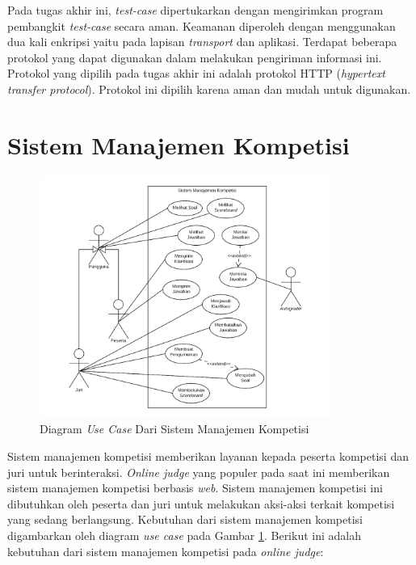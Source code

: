 \par Pada tugas akhir ini, \textit{test-case} dipertukarkan dengan mengirimkan program pembangkit \textit{test-case} secara aman. Keamanan diperoleh dengan menggunakan dua kali enkripsi yaitu pada lapisan \textit{transport} dan aplikasi. Terdapat beberapa protokol yang dapat digunakan dalam melakukan pengiriman informasi ini. Protokol yang dipilih pada tugas akhir ini adalah protokol HTTP (\textit{hypertext transfer protocol}). Protokol ini dipilih karena aman dan mudah untuk digunakan.


\section{Sistem Manajemen Kompetisi}

\begin{figure}[ht!]
    \centering
    \includegraphics[width=0.85\textwidth]{images/oj-use-case}
    \caption{Diagram \textit{Use Case} Dari Sistem Manajemen Kompetisi}
    \label{fig:oj-use-case}
\end{figure}

\par Sistem manajemen kompetisi memberikan layanan kepada peserta kompetisi dan juri untuk berinteraksi. \textit{Online judge} yang populer pada saat ini memberikan sistem manajemen kompetisi berbasis \textit{web}. Sistem manajemen kompetisi ini dibutuhkan oleh peserta dan juri untuk melakukan aksi-aksi terkait kompetisi yang sedang berlangsung. Kebutuhan dari sistem manajemen kompetisi digambarkan oleh diagram \textit{use case} pada Gambar \ref{fig:oj-use-case}. Berikut ini adalah kebutuhan dari sistem manajemen kompetisi pada \textit{online judge}:

